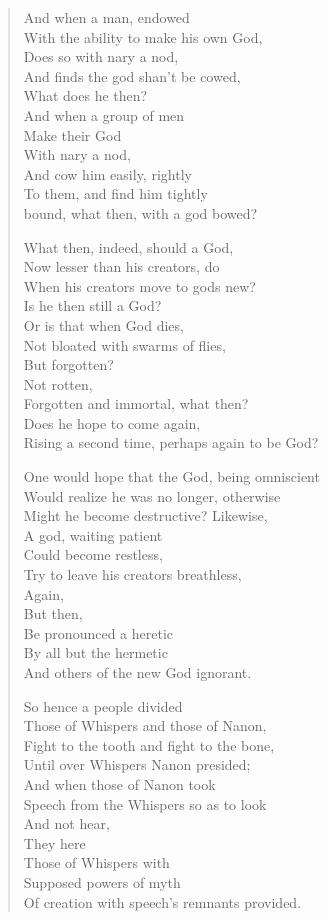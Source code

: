 \begin{leftcolumn}
\begin{verse}
And when a man, endowed\\
\vin With the ability to make his own God,\\
\vin Does so with nary a nod,\\
And finds the god shan't be cowed,\\
\vin What does he then?\\
\vin And when a group of men\\
\vin \vin Make their God\\
\vin \vin With nary a nod,\\
\vin And cow him easily, rightly\\
\vin To them, and find him tightly\\
bound, what then, with a god bowed?

What then, indeed, should a God,\\
\vin Now lesser than his creators, do\\
\vin When his creators move to gods new?\\
Is he then still a God?\\
\vin Or is that when God dies,\\
\vin Not bloated with swarms of flies,\\
\vin \vin But forgotten?\\
\vin \vin Not rotten,\\
\vin Forgotten and immortal, what then?\\
\vin Does he hope to come again,\\
Rising a second time, perhaps again to be God?

One would hope that the God, being omniscient\\
\vin Would realize he was no longer, otherwise\\
\vin Might he become destructive? Likewise,\\
A god, waiting patient\\
\vin Could become restless,\\
\vin Try to leave his creators breathless,\\
\vin \vin Again,\\
\vin \vin But then,\\
\vin Be pronounced a heretic\\
\vin By all but the hermetic\\
And others of the new God ignorant.

So hence a people divided\\
\vin Those of Whispers and those of Nanon,\\
\vin Fight to the tooth and fight to the bone,\\
Until over Whispers Nanon presided;\\
\vin And when those of Nanon took\\
\vin Speech from the Whispers so as to look\\
\vin \vin And not hear,\\
\vin \vin They here\\
\vin Those of Whispers with\\
\vin Supposed powers of myth\\
Of creation with speech's remnants provided.


\end{verse}
\end{leftcolumn}
